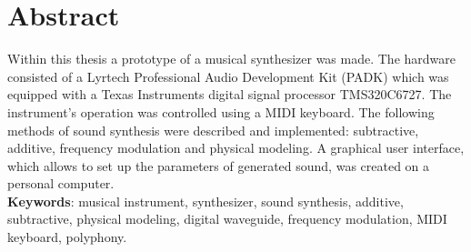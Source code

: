 \chapter*{Abstract}
Within this thesis a prototype of a musical synthesizer was made. The hardware consisted of a Lyrtech Professional Audio Development Kit (PADK) which was equipped with a Texas Instruments digital signal processor TMS320C6727. The instrument's operation was controlled using a MIDI keyboard. The following methods of sound synthesis were described and implemented: subtractive, additive, frequency modulation and physical modeling. A graphical user interface, which allows to set up the parameters of generated sound, was created on a personal computer.
\newline
\\
\textbf{Keywords}: musical instrument, synthesizer, sound synthesis, additive, subtractive, physical modeling, digital waveguide, frequency modulation, MIDI keyboard, polyphony.

